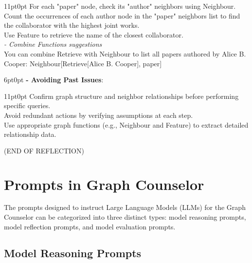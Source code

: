 \documentclass[11pt]{article}
\begin{document}
\begin{tcolorbox}[colback=white!10!white, colframe=blue!30!black, title=Reflection Process, boxrule=1pt, fontupper={\fontsize{7pt}{9pt}\selectfont}]
\begin{adjustwidth}{11pt}{0pt}
    For each "paper" node, check its "author" neighbors using Neighbour.\\
    Count the occurrences of each author node in the "paper" neighbors list to find the collaborator with the highest joint works.\\
    Use Feature to retrieve the name of the closest collaborator.\\
 \textit{- Combine Functions suggestions}\\
    You can combine Retrieve with Neighbour to list all papers authored by Alice B. Cooper: Neighbour[Retrieve[Alice B. Cooper], paper]
\end{adjustwidth}
\begin{adjustwidth}{6pt}{0pt}
 \textbf{- Avoiding Past Issues}: 
\end{adjustwidth}
\begin{adjustwidth}{11pt}{0pt}
   Confirm graph structure and neighbor relationships before performing specific queries.\\
   Avoid redundant actions by verifying assumptions at each step.\\
   Use appropriate graph functions (e.g., Neighbour and Feature) to extract detailed relationship data.
\end{adjustwidth}
    (END OF REFLECTION)
\end{tcolorbox}

\newpage
\section{Prompts in Graph Counselor}
\label{sec:appendixD}
The prompts designed to instruct Large Language Models (LLMs) for the Graph Counselor can be categorized into three distinct types: model reasoning prompts, model reflection prompts, and model evaluation prompts.
\subsection{Model Reasoning Prompts}
\label{sec:appendixD1}
\end{document}

